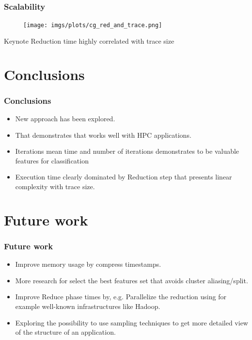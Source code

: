 \documentclass{beamer}
\begin{document}
\begin{frame}
	\frametitle{Scalability}
	\begin{figure}
		\texttt{[image: imgs/plots/cg\_red\_and\_trace.png]}
	\end{figure}
	\begin{block}{Keynote}
		Reduction time highly correlated with trace size
	\end{block}
\end{frame}

\section{Conclusions}
\begin{frame}
\frametitle{Conclusions}
\begin{itemize}[<+->]
	\vfill\item New approach has been explored.
	\vfill\item That demonstrates that works well with HPC applications.
	\vfill\item Iterations mean time and number of iterations demonstrates to be valuable features for classification
	\vfill\item Execution time clearly dominated by Reduction step that presents linear complexity with trace size.
\end{itemize}
\end{frame}

\section{Future work}
\begin{frame}
	\frametitle{Future work}
	\begin{itemize}[<+->]
		\vfill\item Improve memory usage by compress timestamps.
		\vfill\item More research for select the best features set that avoids cluster aliasing/split.
		\vfill\item Improve Reduce phase times by, e.g. Parallelize the reduction using for example well-known infrastructures like Hadoop.
		\vfill\item Exploring the possibility to use sampling techniques to get more detailed view of the structure of an application.
		
	\end{itemize}
\end{frame}
\end{document}

